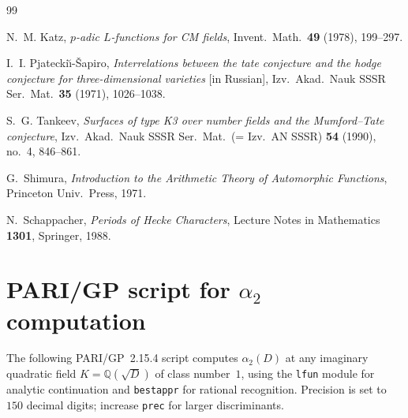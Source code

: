 \documentclass[12pt]{amsart}
\theoremstyle{definition}
\newcommand{\Q}{\mathbb{Q}}
\begin{document}
\begin{thebibliography}{99}

  N.~M. Katz,
  \textit{$p$-adic $L$-functions for CM fields},
  Invent.\ Math.\ \textbf{49} (1978), 199--297.

  I.~I. Pjatecki\u{\i}-\v{S}apiro,
  \textit{Interrelations between the tate conjecture and the hodge conjecture
  for three-dimensional varieties} [in Russian],
  Izv.\ Akad.\ Nauk SSSR Ser.\ Mat.\ \textbf{35} (1971), 1026--1038.

  S.~G. Tankeev,
  \textit{Surfaces of type K3 over number fields and the Mumford--Tate conjecture},
  Izv.\ Akad.\ Nauk SSSR Ser.\ Mat.\ (= Izv.\ AN SSSR) \textbf{54} (1990),
  no.~4, 846--861.

  G.~Shimura,
  \textit{Introduction to the Arithmetic Theory of Automorphic Functions},
  Princeton Univ.\ Press, 1971.

  N.~Schappacher,
  \textit{Periods of Hecke Characters},
  Lecture Notes in Mathematics \textbf{1301}, Springer, 1988.

\end{thebibliography}

\appendix

\section{PARI/GP script for $\alpha_2$ computation}
\label{sec:pari}

The following PARI/GP~2.15.4 script computes $\alpha_2(D)$ at any imaginary
quadratic field $K = \Q(\sqrt{D})$ of class number~$1$, using the
\texttt{lfun} module for analytic continuation and \texttt{bestappr} for
rational recognition.
Precision is set to $150$ decimal digits; increase \texttt{prec} for larger
discriminants.
\end{document}
